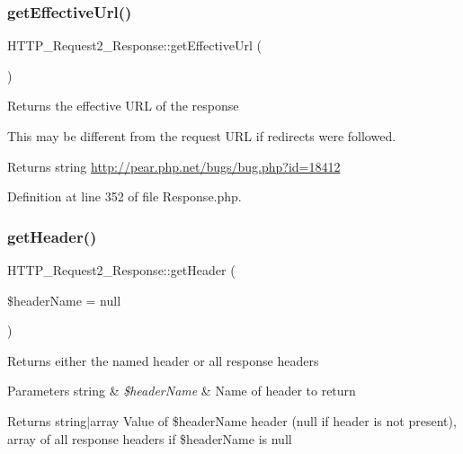 \subsubsection{\texorpdfstring{get\+Effective\+Url()}{getEffectiveUrl()}}
{\footnotesize\ttfamily H\+T\+T\+P\+\_\+\+Request2\+\_\+\+Response\+::get\+Effective\+Url (\begin{DoxyParamCaption}{ }\end{DoxyParamCaption})}

Returns the effective U\+RL of the response

This may be different from the request U\+RL if redirects were followed.

\begin{DoxyReturn}{Returns}
string \hyperlink{}{http\+://pear.\+php.\+net/bugs/bug.\+php?id=18412}
\end{DoxyReturn}


Definition at line 352 of file Response.\+php.

\mbox{\label{classHTTP__Request2__Response_a4fcafd1538662af1415ccf12cae68c62}} 
\subsubsection{\texorpdfstring{get\+Header()}{getHeader()}}
{\footnotesize\ttfamily H\+T\+T\+P\+\_\+\+Request2\+\_\+\+Response\+::get\+Header (\begin{DoxyParamCaption}\item[{}]{\$header\+Name = {\ttfamily null} }\end{DoxyParamCaption})}

Returns either the named header or all response headers


\begin{DoxyParams}[1]{Parameters}
string & {\em \$header\+Name} & Name of header to return\\
\hline
\end{DoxyParams}
\begin{DoxyReturn}{Returns}
string$\vert$array Value of \$header\+Name header (null if header is not present), array of all response headers if \$header\+Name is null 
\end{DoxyReturn}


